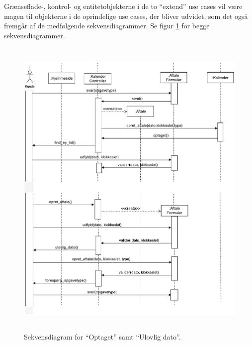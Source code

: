 \documentclass[12pt]{article}   %
\begin{document}
Grænseflade-, kontrol- og entitetobjekterne i de to ``extend'' use cases vil
være magen til objekterne i de oprindelige use cases, der bliver udvidet, som
det også fremgår af de medfølgende sekvensdiagrammer. Se figur
\ref{fig:extseq} for begge sekvensdiagrammer. 


\begin{figure}[!ht]
\includegraphics[width=13cm, height=15cm]{ext.pdf}
\caption{Sekvensdiagram for ``Optaget'' samt  ``Ulovlig dato''.}
\label{fig:extseq}
\end{figure}
\end{document}
